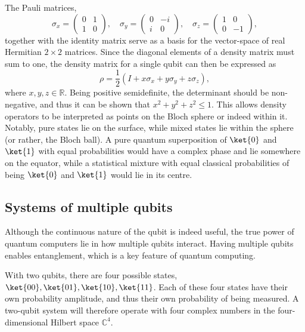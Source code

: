 The Pauli matrices,
\begin{equation}
    \sigma_x = \begin{pmatrix} 0 & 1 \\ 1 & 0 \end{pmatrix}, \quad
    \sigma_y = \begin{pmatrix} 0 & -i \\ i & 0 \end{pmatrix}, \quad
    \sigma_z = \begin{pmatrix} 1 & 0 \\ 0 & -1 \end{pmatrix},
    \label{eq:pauli}
\end{equation}
together with the identity matrix serve as a basis for the vector-space of real Hermitian $2\times 2$ matrices.
Since the diagonal elements of a density matrix must sum to one, the density matrix for a single qubit can then be expressed as
\begin{equation}
    \rho = \frac{1}{2} \left(I + x \sigma_x + y \sigma_y + z \sigma_z\right),
\end{equation}
where $x, y, z \in \mathbb{R}$.
Being positive semidefinite, the determinant should be non-negative, and thus it can be shown that $x^2 + y^2 + z^2 \leq 1$.
This allows density operators to be interpreted as points on the Bloch sphere or indeed within it.
Notably, pure states lie on the surface, while mixed states lie within the sphere (or rather, the Bloch ball).
A pure quantum superposition of $\ket{0}$ and $\ket{1}$ with equal probabilities would have a complex phase and lie somewhere on the equator, while a statistical mixture with equal classical probabilities of being $\ket{0}$ and $\ket{1}$ would lie in its centre.

\subsection{Systems of multiple qubits}
Although the continuous nature of the qubit is indeed useful, the true power of quantum computers lie in how multiple qubits interact.
Having multiple qubits enables entanglement, which is a key feature of quantum computing.

With two qubits, there are four possible states, $\ket{00}, \ket{01}, \ket{10}, \ket{11}$.
Each of these four states have their own probability amplitude, and thus their own probability of being measured.
A two-qubit system will therefore operate with four complex numbers in the four-dimensional Hilbert space $\mathbb{C}^{4}$.

